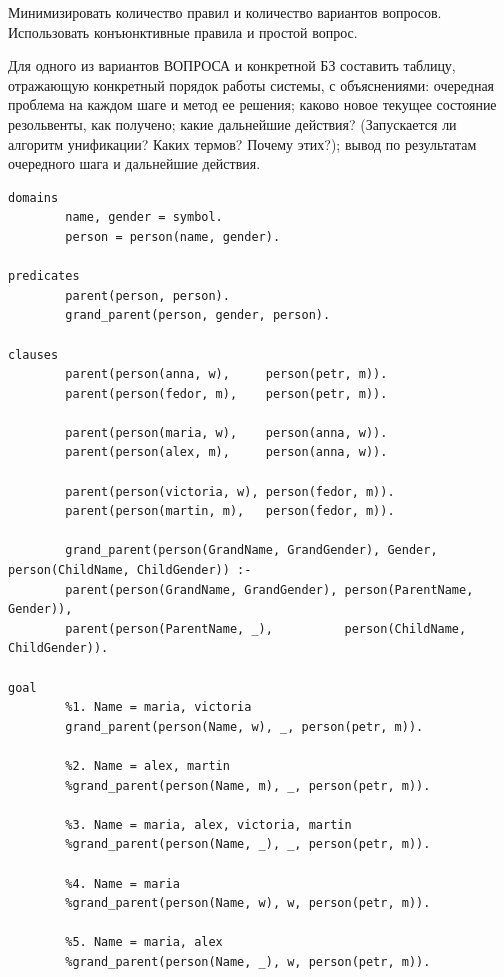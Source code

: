 \documentclass[12pt,a4paper]{scrreprt}
\begin{document}
Минимизировать количество правил и количество вариантов вопросов. Использовать конъюнктивные правила и простой вопрос.

Для одного из вариантов ВОПРОСА и конкретной БЗ составить таблицу, отражающую конкретный порядок работы системы, с объяснениями: очередная проблема на каждом шаге и метод ее решения; каково новое текущее состояние резольвенты, как получено; какие дальнейшие действия? (Запускается ли алгоритм унификации? Каких термов? Почему этих?);
вывод по результатам очередного шага и дальнейшие действия.

\clearpage
\begin{lstlisting}
domains
		name, gender = symbol.
		person = person(name, gender).
	
predicates
		parent(person, person).
		grand_parent(person, gender, person).
	
clauses
		parent(person(anna, w),     person(petr, m)).
		parent(person(fedor, m),    person(petr, m)).
		
		parent(person(maria, w),    person(anna, w)).
		parent(person(alex, m),     person(anna, w)).
		
		parent(person(victoria, w), person(fedor, m)).
		parent(person(martin, m),   person(fedor, m)).
		
		grand_parent(person(GrandName, GrandGender), Gender, person(ChildName, ChildGender)) :- 
		parent(person(GrandName, GrandGender), person(ParentName, Gender)),
		parent(person(ParentName, _),          person(ChildName, ChildGender)).
	
goal
		%1. Name = maria, victoria
		grand_parent(person(Name, w), _, person(petr, m)).
		
		%2. Name = alex, martin
		%grand_parent(person(Name, m), _, person(petr, m)).
		
		%3. Name = maria, alex, victoria, martin
		%grand_parent(person(Name, _), _, person(petr, m)).
		
		%4. Name = maria
		%grand_parent(person(Name, w), w, person(petr, m)).
		
		%5. Name = maria, alex
		%grand_parent(person(Name, _), w, person(petr, m)).
\end{lstlisting}
\end{document}
